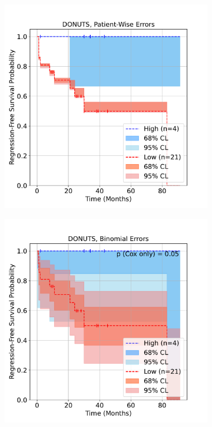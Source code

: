 \documentclass[article]{jss}
\begin{document}
\begin{figure}[ht]
\begin{subfigure}[c]{\figwidth}
    \caption{\label{fig:lung-dataset-donuts}}
  \end{subfigure}
  \begin{subfigure}[c]{\figwidth}
    \centering
    \includegraphics[width=\linewidth]{lung_donuts_km_RFS_patient_wise.pdf}
    \caption{\label{fig:lung-dataset-donuts-patient-wise}}
  \end{subfigure}
  \begin{subfigure}[c]{\figwidth}
    \centering
    \includegraphics[width=\linewidth]{lung_donuts_km_RFS_binomial.pdf}

\end{subfigure}
\end{figure}
\end{document}
